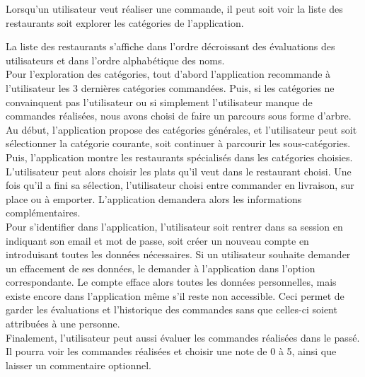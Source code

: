 \documentclass[10pt, a4paper]{article}
\begin{document}
Lorsqu'un utilisateur veut réaliser une commande, il peut soit voir la liste des restaurants soit explorer les catégories de l'application.

La liste des restaurants s'affiche dans l'ordre décroissant des évaluations des utilisateurs et dans l'ordre alphabétique des noms. \\

Pour l'exploration des catégories, tout d'abord l'application recommande à l'utilisateur les 3 dernières catégories commandées. Puis, si les catégories ne convainquent pas l'utilisateur ou si simplement l'utilisateur manque de commandes réalisées, nous avons choisi de faire un parcours sous forme d'arbre. Au début, l'application propose des catégories générales, et l'utilisateur peut soit sélectionner la catégorie courante, soit continuer à parcourir les sous-catégories. Puis, l'application montre les restaurants spécialisés dans les catégories choisies. \\

L'utilisateur peut alors choisir les plats qu'il veut dans le restaurant choisi. Une fois qu'il a fini sa sélection, l'utilisateur choisi entre commander en livraison, sur place ou à emporter. L'application demandera alors les informations complémentaires. \\

Pour s'identifier dans l'application, l'utilisateur soit rentrer dans sa session en indiquant son email et mot de passe, soit créer un nouveau compte en introduisant toutes les données nécessaires. Si un utilisateur souhaite demander un effacement de ses données, le demander à l'application dans l'option correspondante. Le compte efface alors toutes les données personnelles, mais existe encore dans l'application même s'il reste non accessible. Ceci permet de garder les évaluations et l'historique des commandes sans que celles-ci soient attribuées à une personne. \\

Finalement, l'utilisateur peut aussi évaluer les commandes réalisées dans le passé. Il pourra voir les commandes réalisées et choisir une note de 0 à 5, ainsi que laisser un commentaire optionnel.
\end{document}
